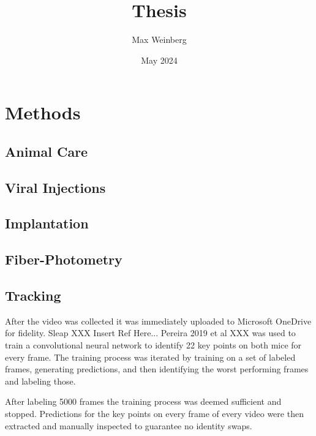 \documentclass[12pt,english]{article}
\title{Thesis}
\author{Max Weinberg}
\date{May 2024}
\begin{document}
\maketitle

\section{Methods}

\subsection{Animal Care}

\subsection{Viral Injections}

\subsection{Implantation}

\subsection{Fiber-Photometry}

\subsection{Tracking}



After the video was collected it was immediately uploaded to Microsoft OneDrive for fidelity. Sleap XXX Insert Ref Here... Pereira 2019 et al XXX was used to train a convolutional neural network to identify 22 key points on both mice for every frame. The training process was iterated by training on a set of labeled frames, generating predictions, and then identifying the worst performing frames and labeling those. 


After labeling 5000 frames the training process was deemed sufficient and stopped. Predictions for the key points on every frame of every video were then extracted and manually inspected to guarantee no identity swaps. 

\end{document}
